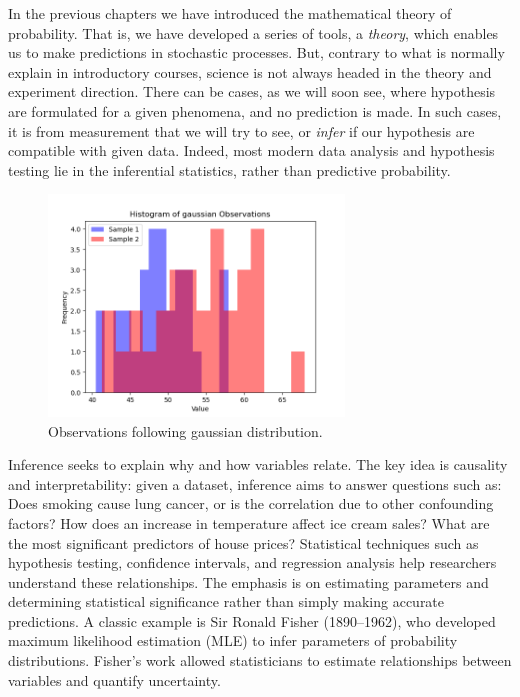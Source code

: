 \documentclass{book}
\begin{document}
In the previous chapters we have introduced the mathematical theory of probability. That is, we have developed a series of tools, a \textit{theory}, which enables us to make predictions in stochastic processes. But, contrary to what is normally explain in introductory courses, science is not always headed in the theory and experiment direction. There can be cases, as we will soon see, where hypothesis are formulated for a given phenomena, and no prediction is made. In such cases, it is from measurement that we will try to see, or \textit{infer} if our hypothesis are compatible with given data. Indeed, most modern data analysis and hypothesis testing lie in the inferential statistics, rather than predictive probability.

\begin{figure}[ht]
    \centering
    \includegraphics[width=0.7\textwidth]{figures/chapter4/f_observations.png}
    \caption{Observations following gaussian distribution.}
    \label{fig:f_obs}
\end{figure}

Inference seeks to explain why and how variables relate. The key idea is causality and interpretability: given a dataset, inference aims to answer questions such as: Does smoking cause lung cancer, or is the correlation due to other confounding factors? How does an increase in temperature affect ice cream sales? What are the most significant predictors of house prices? Statistical techniques such as hypothesis testing, confidence intervals, and regression analysis help researchers understand these relationships. The emphasis is on estimating parameters and determining statistical significance rather than simply making accurate predictions. A classic example is Sir Ronald Fisher (1890–1962), who developed maximum likelihood estimation (MLE) to infer parameters of probability distributions. Fisher’s work allowed statisticians to estimate relationships between variables and quantify uncertainty.\\
\end{document}
